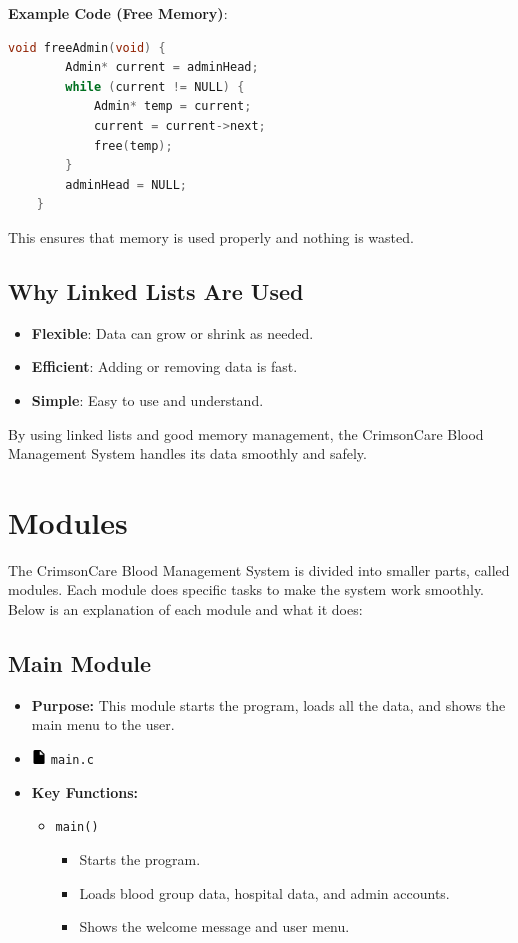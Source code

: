 \documentclass[12pt,a4paper]{report}
\begin{document}
\normalsize \textbf{Example Code (Free Memory)}:
\begin{lstlisting}[language=C, caption=Freeing the Admin List]
    void freeAdmin(void) {
        Admin* current = adminHead;
        while (current != NULL) {
            Admin* temp = current;
            current = current->next;
            free(temp);
        }
        adminHead = NULL;
    }
\end{lstlisting}

This ensures that memory is used properly and nothing is wasted.

\subsection*{Why Linked Lists Are Used}
\begin{itemize}
    \item \textbf{Flexible}: Data can grow or shrink as needed.
    \item \textbf{Efficient}: Adding or removing data is fast.
    \item \textbf{Simple}: Easy to use and understand.
\end{itemize}

By using linked lists and good memory management, the CrimsonCare Blood Management System handles its data smoothly and safely.

\section{Modules}
The CrimsonCare Blood Management System is divided into smaller parts, called modules.
Each module does specific tasks to make the system work smoothly. Below is an explanation of each module and what it does:

\subsection{Main Module}
\begin{itemize}
    \item \normalsize \textbf{Purpose:} This module starts the program, loads all the data, and shows the main menu to the user.
    \item \normalsize \includegraphics[width=0.03\textwidth]{../resources/assets/images/file_icon.png} \texttt{main.c}
    \item \normalsize \textbf{Key Functions:}
    \begin{itemize}
        \item \normalsize \texttt{main()}
        \begin{itemize}
            \item Starts the program.
            \item Loads blood group data, hospital data, and admin accounts.
            \item Shows the welcome message and user menu.
        \end{itemize}
    \end{itemize}
\end{itemize}
\end{document}
